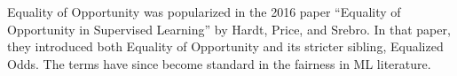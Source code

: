 \clearpage

\thispagestyle{customstyle}

{Equality of Opportunity was popularized in the 2016 paper “Equality of Opportunity in Supervised Learning” by Hardt, Price, and Srebro. 
In that paper, they introduced both Equality of Opportunity and its stricter sibling, Equalized Odds. The terms have since become standard
in the fairness in ML literature.}
